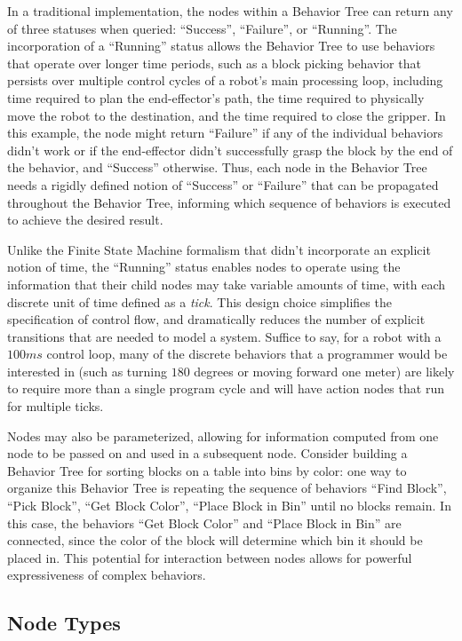 In a traditional implementation, the nodes within a Behavior Tree can return any of three statuses when queried: ``Success'', ``Failure'', or ``Running''. The incorporation of a ``Running'' status allows the Behavior Tree to use behaviors that operate over longer time periods, such as a block picking behavior that persists over multiple control cycles of a robot's main processing loop, including time required to plan the end-effector's path, the time required to physically move the robot to the destination, and the time required to close the gripper. In this example, the node might return ``Failure'' if any of the individual behaviors didn't work or if the end-effector didn't successfully grasp the block by the end of the behavior, and ``Success'' otherwise. Thus, each node in the Behavior Tree needs a rigidly defined notion of ``Success'' or ``Failure'' that can be propagated throughout the Behavior Tree, informing which sequence of behaviors is executed to achieve the desired result.

Unlike the Finite State Machine formalism that didn't incorporate an explicit notion of time, the ``Running'' status enables nodes to operate using the information that their child nodes may take variable amounts of time, with each discrete unit of time defined as a \textsl{tick}. This design choice simplifies the specification of control flow, and dramatically reduces the number of explicit transitions that are needed to model a system. Suffice to say, for a robot with a $100ms$ control loop, many of the discrete behaviors that a programmer would be interested in (such as turning $180$ degrees or moving forward one meter) are likely to require more than a single program cycle and will have action nodes that run for multiple ticks.

Nodes may also be parameterized, allowing for information computed from one node to be passed on and used in a subsequent node. Consider building a Behavior Tree for sorting blocks on a table into bins by color: one way to organize this Behavior Tree is repeating the sequence of behaviors ``Find Block'', ``Pick Block'', ``Get Block Color'', ``Place Block in Bin'' until no blocks remain. In this case, the behaviors ``Get Block Color'' and ``Place Block in Bin'' are connected, since the color of the block will determine which bin it should be placed in. This potential for interaction between nodes allows for powerful expressiveness of complex behaviors.

\subsection{Node Types}

